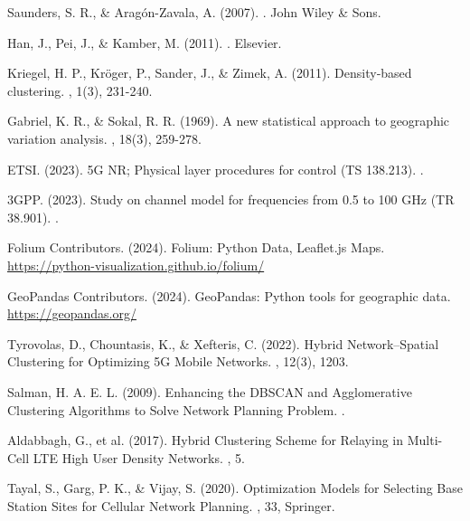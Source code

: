 \documentclass[12pt,a4paper]{report}
\begin{document}
\begin{thebibliography}{40}
Saunders, S. R., \& Aragón-Zavala, A. (2007).
.
\newblock John Wiley \& Sons.

Han, J., Pei, J., \& Kamber, M. (2011).
.
\newblock Elsevier.

Kriegel, H. P., Kröger, P., Sander, J., \& Zimek, A. (2011).
\newblock Density‐based clustering.
, 1(3), 231-240.

Gabriel, K. R., \& Sokal, R. R. (1969).
\newblock A new statistical approach to geographic variation analysis.
, 18(3), 259-278.

ETSI. (2023).
\newblock 5G NR; Physical layer procedures for control (TS 138.213).
.

3GPP. (2023).
\newblock Study on channel model for frequencies from 0.5 to 100 GHz (TR 38.901).
.

Folium Contributors. (2024).
\newblock Folium: Python Data, Leaflet.js Maps.
\newblock \url{https://python-visualization.github.io/folium/}

GeoPandas Contributors. (2024).
\newblock GeoPandas: Python tools for geographic data.
\newblock \url{https://geopandas.org/}


Tyrovolas, D., Chountasis, K., \& Xefteris, C. (2022).
\newblock Hybrid Network–Spatial Clustering for Optimizing 5G Mobile Networks.
, 12(3), 1203.

Salman, H. A. E. L. (2009).
\newblock Enhancing the DBSCAN and Agglomerative Clustering Algorithms to Solve Network Planning Problem.
.

Aldabbagh, G., et al. (2017).
\newblock Hybrid Clustering Scheme for Relaying in Multi-Cell LTE High User Density Networks.
, 5.

Tayal, S., Garg, P. K., \& Vijay, S. (2020).
\newblock Optimization Models for Selecting Base Station Sites for Cellular Network Planning.
, 33, Springer.


\end{thebibliography}
\end{document}
